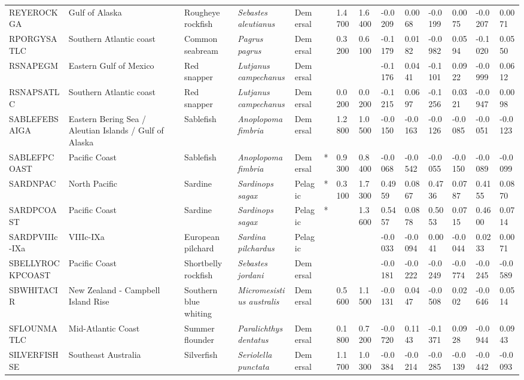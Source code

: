 \begin{longtable}{p{2.8cm}p{2cm}p{1.7cm}p{1.7cm}p{1cm}p{0.3cm}p{1cm}p{1cm}p{1cm}p{1cm}p{1cm}p{1cm}p{1cm}p{1cm}}
  REYEROCKGA & Gulf of Alaska & Rougheye rockfish & \textit{Sebastes aleutianus} & Demersal &   & 1.4700 & 1.6400 & -0.0209 & 0.0068 & -0.0199 & 0.0075 & -0.0207 & 0.0071 \\ 
  RPORGYSATLC & Southern Atlantic coast & Common seabream & \textit{Pagrus pagrus} & Demersal &   & 0.3200 & 0.6100 & -0.1179 & 0.0182 & -0.0982 & 0.0594 & -0.1020 & 0.0550 \\ 
  RSNAPEGM & Eastern Gulf of Mexico & Red snapper & \textit{Lutjanus campechanus} & Demersal &  &  &  & -0.1176 & 0.0441 & -0.1101 & 0.0922 & -0.0999 & 0.0612 \\ 
  RSNAPSATLC & Southern Atlantic coast & Red snapper & \textit{Lutjanus campechanus} & Demersal &   & 0.0200 & 0.0200 & -0.1215 & 0.0697 & -0.1256 & 0.0321 & -0.0947 & 0.0098 \\ 
  SABLEFEBSAIGA & Eastern Bering Sea / Aleutian Islands / Gulf of Alaska & Sablefish & \textit{Anoplopoma fimbria} & Demersal &   & 1.2800 & 1.0500 & -0.0150 & -0.0163 & -0.0126 & -0.0085 & -0.0051 & -0.0123 \\ 
  SABLEFPCOAST & Pacific Coast & Sablefish & \textit{Anoplopoma fimbria} & Demersal & * & 0.9300 & 0.8400 & -0.0068 & -0.0542 & -0.0055 & -0.0150 & -0.0089 & -0.0099 \\ 
  SARDNPAC & North Pacific & Sardine & \textit{Sardinops sagax} & Pelagic & * & 0.3100 & 1.7300 & 0.4959 & 0.0867 & 0.4736 & 0.0787 & 0.4155 & 0.0870 \\ 
  SARDPCOAST & Pacific Coast & Sardine & \textit{Sardinops sagax} & Pelagic & * &  & 1.3600 & 0.5457 & 0.0878 & 0.5053 & 0.0715 & 0.4600 & 0.0714 \\ 
  SARDPVIIIc-IXa & VIIIc-IXa & European pilchard & \textit{Sardina pilchardus} & Pelagic &  &  &  & -0.0033 & -0.0094 & 0.0041 & -0.0044 & 0.0233 & 0.0071 \\ 
  SBELLYROCKPCOAST & Pacific Coast & Shortbelly rockfish & \textit{Sebastes jordani} & Demersal &  &  &  & -0.0181 & -0.0222 & -0.0249 & -0.0774 & -0.0245 & -0.0589 \\ 
  SBWHITACIR & New Zealand - Campbell Island Rise & Southern blue whiting & \textit{Micromesistius australis} & Demersal &   & 0.5600 & 1.1500 & -0.0131 & 0.0447 & -0.0508 & 0.0202 & -0.0646 & 0.0514 \\ 
  SFLOUNMATLC & Mid-Atlantic Coast & Summer flounder & \textit{Paralichthys dentatus} & Demersal &   & 0.1800 & 0.7200 & -0.0720 & 0.1143 & -0.1371 & 0.0928 & -0.0944 & 0.0943 \\ 
  SILVERFISHSE & Southeast Australia & Silverfish & \textit{Seriolella punctata} & Demersal &   & 1.1700 & 1.0300 & -0.0384 & -0.0214 & -0.0285 & -0.0139 & -0.0442 & -0.0093 \\ 

\end{longtable}
